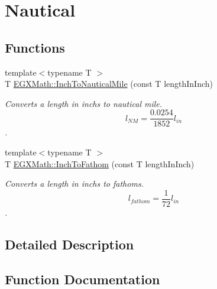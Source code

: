 \hypertarget{group___e_g_x_math-_conversions-_length_conversions-_imperial-_inch-_nautical}{}\section{Nautical}
\label{group___e_g_x_math-_conversions-_length_conversions-_imperial-_inch-_nautical}
\subsection*{Functions}
\begin{DoxyCompactItemize}
\item 
{\footnotesize template$<$typename T $>$ }\\T \mbox{\hyperlink{group___e_g_x_math-_conversions-_length_conversions-_imperial-_inch-_nautical_ga40c14b43d58b6c2e3cebb1ff491bdcef}{E\+G\+X\+Math\+::\+Inch\+To\+Nautical\+Mile}} (const T length\+In\+Inch)
\begin{DoxyCompactList}\small\item\em Converts a length in inchs to nautical mile. \[ l_{NM}= \frac{0.0254}{1852} l_{in} \]. \end{DoxyCompactList}\item 
{\footnotesize template$<$typename T $>$ }\\T \mbox{\hyperlink{group___e_g_x_math-_conversions-_length_conversions-_imperial-_inch-_nautical_ga27466d2f562e05c664fb189f8e96e18c}{E\+G\+X\+Math\+::\+Inch\+To\+Fathom}} (const T length\+In\+Inch)
\begin{DoxyCompactList}\small\item\em Converts a length in inchs to fathoms. \[ l_{fathom}= \frac{1}{72} l_{in} \]. \end{DoxyCompactList}\end{DoxyCompactItemize}


\subsection{Detailed Description}


\subsection{Function Documentation}
\mbox{\label{group___e_g_x_math-_conversions-_length_conversions-_imperial-_inch-_nautical_ga27466d2f562e05c664fb189f8e96e18c}} 

